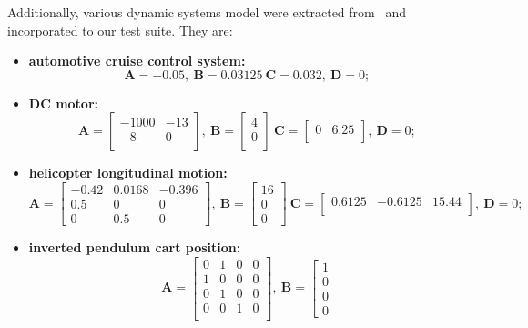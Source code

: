 \documentclass[runningheads,a4paper]{llncs}
\begin{document}
Additionally, various dynamic systems model were extracted from~\cite{Franklin15} and incorporated to our test suite. They are: 
\begin{itemize}
\item{\textbf{automotive cruise control system:} 
$$
\textbf{A}=-0.05,~ \textbf{B} = 0.03125~
\textbf{C}=0.032,~ \textbf{D}= 0;
$$
}
\item{\textbf{DC motor:} 
$$
\textbf{A}=\left[\begin{array}{cc}
-1000		& -13 \\
-8			& 0\\
\end{array}\right],~ \textbf{B} = \left[\begin{array}{c}
4 \\ 0 \\
\end{array}\right]~
\textbf{C}=\left[\begin{array}{cc}
0 & 6.25\\
\end{array}\right],~ \textbf{D}= 0;
$$
}
\item{\textbf{helicopter longitudinal motion:} 
$$
\textbf{A}=\left[\begin{array}{ccc}
-0.42		& 0.0168		& -0.396	\\
0.5			& 0				& 0			\\
0			& 0.5 			& 0			
\end{array}\right],~ \textbf{B} = \left[\begin{array}{c}
16 \\ 0 \\ 0
\end{array}\right]~
\textbf{C}=\left[\begin{array}{ccc}
0.6125	& -0.6125	& 15.44 \\
\end{array}\right],~ \textbf{D}= 0;
$$
}
\item{\textbf{inverted pendulum cart position:} 
$$
\textbf{A}=\left[\begin{array}{cccc}
0		& 1		& 0 	& 0	\\
1		& 0		& 0		& 0	\\
0		& 1 	& 0		& 0 \\
0		& 0		& 1 	& 0 \\	
\end{array}\right],~ \textbf{B} = \left[\begin{array}{c}
1 \\ 0 \\ 0 \\ 0

\end{array}$$}
\end{itemize}
\end{document}
